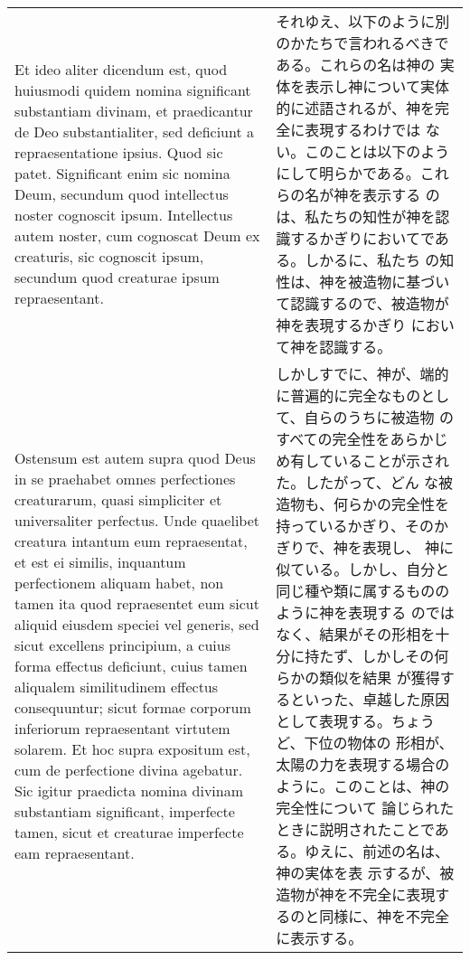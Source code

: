 \documentclass[paper=a4paper,fontsize=10pt,jafontsize=9pt,titlepage]{jlreq}
\begin{document}
\begin{longtable}{p{21em}p{21em}}
\\

Et ideo aliter dicendum est, quod huiusmodi quidem nomina significant
substantiam divinam, et praedicantur de Deo substantialiter, sed
deficiunt a repraesentatione ipsius. Quod sic patet. Significant enim
sic nomina Deum, secundum quod intellectus noster cognoscit
ipsum. Intellectus autem noster, cum cognoscat Deum ex creaturis, sic
cognoscit ipsum, secundum quod creaturae ipsum repraesentant.

&

それゆえ、以下のように別のかたちで言われるべきである。これらの名は神の
実体を表示し神について実体的に述語されるが、神を完全に表現するわけでは
ない。このことは以下のようにして明らかである。これらの名が神を表示する
のは、私たちの知性が神を認識するかぎりにおいてである。しかるに、私たち
の知性は、神を被造物に基づいて認識するので、被造物が神を表現するかぎり
において神を認識する。

\\

Ostensum est autem supra quod Deus in se praehabet omnes perfectiones
creaturarum, quasi simpliciter et universaliter perfectus. Unde
quaelibet creatura intantum eum repraesentat, et est ei similis,
inquantum perfectionem aliquam habet, non tamen ita quod repraesentet
eum sicut aliquid eiusdem speciei vel generis, sed sicut excellens
principium, a cuius forma effectus deficiunt, cuius tamen aliqualem
similitudinem effectus consequuntur; sicut formae corporum inferiorum
repraesentant virtutem solarem. Et hoc supra expositum est, cum de
perfectione divina agebatur. Sic igitur praedicta nomina divinam
substantiam significant, imperfecte tamen, sicut et creaturae
imperfecte eam repraesentant.

&

しかしすでに、神が、端的に普遍的に完全なものとして、自らのうちに被造物
のすべての完全性をあらかじめ有していることが示された。したがって、どん
な被造物も、何らかの完全性を持っているかぎり、そのかぎりで、神を表現し、
神に似ている。しかし、自分と同じ種や類に属するもののように神を表現する
のではなく、結果がその形相を十分に持たず、しかしその何らかの類似を結果
が獲得するといった、卓越した原因として表現する。ちょうど、下位の物体の
形相が、太陽の力を表現する場合のように。このことは、神の完全性について
論じられたときに説明されたことである。ゆえに、前述の名は、神の実体を表
示するが、被造物が神を不完全に表現するのと同様に、神を不完全に表示する。

\\


\end{longtable}
\end{document}
